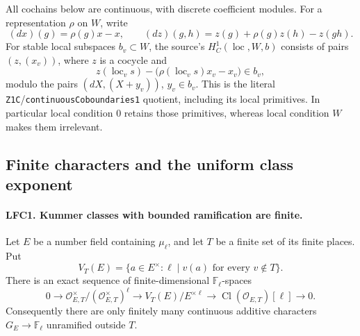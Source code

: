 \documentclass[11pt,a4paper]{article}
\numberwithin{equation}{section}
\theoremstyle{remark}\newtheorem{remark}[theorem]{Remark}
\begin{document}
All cochains below are continuous, with discrete coefficient
modules.  For a representation \(\rho\) on \(W\), write
\[
 (d x)(g)=\rho(g)x-x,\qquad
 (d z)(g,h)=z(g)+\rho(g)z(h)-z(gh).
\]
For stable local subspaces \(b_v\subset W\), the source's
\(H^1_C(\operatorname{loc},W,b)\) consists of pairs
\((z,(x_v))\), where \(z\) is a cocycle and
\[
 z(\operatorname{loc}_v s)
       -\bigl(\rho(\operatorname{loc}_v s)x_v-x_v\bigr)\in b_v,
                                                        \tag{LFC.3}
\]
modulo the pairs \((dX,(X+y_v))\), \(y_v\in b_v\).
This is the literal \texttt{Z1C}/\texttt{continuous\allowbreak Coboundaries1}
quotient, including its local primitives.  In particular local
condition \(0\) retains those primitives, whereas local condition
\(W\) makes them irrelevant.

\subsection{Finite characters and the uniform class exponent}

\paragraph{LFC1. Kummer classes with bounded ramification are finite.}
\label{claim:LFC1}
Let \(E\) be a number field containing \(\mu_\ell\), and let
\(T\) be a finite set of its finite places.  Put
\[
 V_T(E)=\{a\in E^\times:\ell\mid v(a)\text{ for every }v\notin T\}.
\]
There is an exact sequence of finite-dimensional
\(\mathbb F_\ell\)-spaces
\[
 0\longrightarrow
   \mathcal O_{E,T}^{\times}/(\mathcal O_{E,T}^{\times})^\ell
 \longrightarrow V_T(E)/E^{\times\ell}
 \longrightarrow \operatorname{Cl}(\mathcal O_{E,T})[\ell]
 \longrightarrow0.                                     \tag{LFC.4}
\]
Consequently there are only finitely many continuous additive
characters \(G_E\to\mathbb F_\ell\) unramified outside \(T\).
\end{document}
